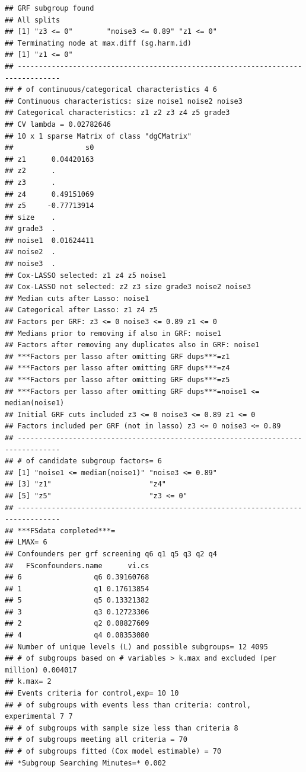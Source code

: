 \documentclass[12pt]{article}
\makeatletter
\newenvironment{kframe}{%
 \def\at@end@of@kframe{}%
 \ifinner\ifhmode%
  \def\at@end@of@kframe{\end{minipage}}%
  \begin{minipage}{\columnwidth}%
 \fi\fi%
 \def\FrameCommand##1{\hskip\@totalleftmargin \hskip-\fboxsep
 \colorbox{shadecolor}{##1}\hskip-\fboxsep
     \hskip-\linewidth \hskip-\@totalleftmargin \hskip\columnwidth}%
 \MakeFramed {\advance\hsize-\width
   \@totalleftmargin\z@ \linewidth\hsize
   \@setminipage}}%
 {\par\unskip\endMakeFramed%
 \at@end@of@kframe}
\newenvironment{knitrout}{}{} %
\makeatother
\begin{document}
\begin{knitrout}
\begin{kframe}
\begin{verbatim}
## GRF subgroup found
## All splits
## [1] "z3 <= 0"        "noise3 <= 0.89" "z1 <= 0"       
## Terminating node at max.diff (sg.harm.id)
## [1] "z1 <= 0"
## --------------------------------------------------------------------------------
## # of continuous/categorical characteristics 4 6 
## Continuous characteristics: size noise1 noise2 noise3 
## Categorical characteristics: z1 z2 z3 z4 z5 grade3 
## CV lambda = 0.02782646 
## 10 x 1 sparse Matrix of class "dgCMatrix"
##                 s0
## z1      0.04420163
## z2      .         
## z3      .         
## z4      0.49151069
## z5     -0.77713914
## size    .         
## grade3  .         
## noise1  0.01624411
## noise2  .         
## noise3  .         
## Cox-LASSO selected: z1 z4 z5 noise1 
## Cox-LASSO not selected: z2 z3 size grade3 noise2 noise3 
## Median cuts after Lasso: noise1 
## Categorical after Lasso: z1 z4 z5 
## Factors per GRF: z3 <= 0 noise3 <= 0.89 z1 <= 0 
## Medians prior to removing if also in GRF: noise1 
## Factors after removing any duplicates also in GRF: noise1 
## ***Factors per lasso after omitting GRF dups***=z1
## ***Factors per lasso after omitting GRF dups***=z4
## ***Factors per lasso after omitting GRF dups***=z5
## ***Factors per lasso after omitting GRF dups***=noise1 <= median(noise1)
## Initial GRF cuts included z3 <= 0 noise3 <= 0.89 z1 <= 0 
## Factors included per GRF (not in lasso) z3 <= 0 noise3 <= 0.89 
## --------------------------------------------------------------------------------
## # of candidate subgroup factors= 6 
## [1] "noise1 <= median(noise1)" "noise3 <= 0.89"          
## [3] "z1"                       "z4"                      
## [5] "z5"                       "z3 <= 0"                 
## --------------------------------------------------------------------------------
## ***FSdata completed***=
## LMAX= 6 
## Confounders per grf screening q6 q1 q5 q3 q2 q4 
##   FSconfounders.name      vi.cs
## 6                 q6 0.39160768
## 1                 q1 0.17613854
## 5                 q5 0.13321382
## 3                 q3 0.12723306
## 2                 q2 0.08827609
## 4                 q4 0.08353080
## Number of unique levels (L) and possible subgroups= 12 4095 
## # of subgroups based on # variables > k.max and excluded (per million) 0.004017 
## k.max= 2 
## Events criteria for control,exp= 10 10 
## # of subgroups with events less than criteria: control, experimental 7 7 
## # of subgroups with sample size less than criteria 8 
## # of subgroups meeting all criteria = 70 
## # of subgroups fitted (Cox model estimable) = 70 
## *Subgroup Searching Minutes=* 0.002 

\end{verbatim}
\end{kframe}
\end{knitrout}
\end{document}
